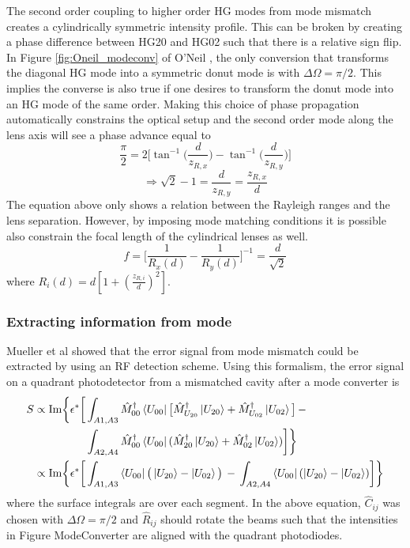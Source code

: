 The second order coupling to higher order HG modes from mode mismatch creates a cylindrically symmetric intensity profile.  This can be broken by creating a phase difference between HG20 and HG02 such that there is a relative sign flip.  In Figure \ref{fig:Oneil_modeconv} of O'Neil \cite{ONeilModeTransform}, the only conversion that transforms the diagonal HG mode into a symmetric donut mode is with $\Delta \Omega = \pi/2$. This implies the converse is also true if one desires to transform the donut mode into an HG mode of the same order. Making this choice of phase propagation automatically constrains the optical setup and the second order mode along the lens axis will see a phase advance equal to
	\begin{equation}
	\frac{\pi}{2} = 2\bigg[\tan^{-1}\bigg(\frac{d}{z_{R,x}}\bigg) - \tan^{-1} \bigg(\frac{d}{z_{R,y}} \bigg)  \bigg]
	\end{equation} 
	\begin{equation}
	  \Rightarrow \sqrt{2} - 1 = \frac{d}{z_{R,y}} = \frac{z_{R,x}}{d}
	\end{equation}
The equation above only shows a relation between the Rayleigh ranges and the lens separation. However, by imposing mode matching conditions it is possible also constrain the focal length of the cylindrical lenses as well.
	\begin{equation}
	f = \bigg[\frac{1}{R_x(d)} - \frac{1}{R_y(d)}\bigg]^{-1} = \frac{d}{\sqrt{2}}
	\end{equation}
	where $R_i(d) = d [ 1 + (\frac{z_{R,i}}{d})^2]$.

\subsubsection{Extracting information from mode}
Mueller et al \cite{MuellerMM} showed that the error signal from mode mismatch could be extracted by using an RF detection scheme. Using this formalism, the error signal on a quadrant photodetector from a mismatched cavity after a mode converter is 
	\begin{equation}
	\begin{aligned}
	S 	\propto  \text{Im} \bigg\{ \epsilon^{*} \bigg[&\int_{A1,A3} \hat{M}^{\dagger}_{00} \bra{U_{00}} \big[\hat{M}^{\dagger}_{U_{20}} \ket{U_{20}} + \hat{M}^{\dagger}_{U_{02}} \ket{U_{02}}\big]  \, -\\
	 \, &\int_{A2,A4} \hat{M}^{\dagger}_{00} \bra{U_{00}} (\hat{M}^{\dagger}_{20} \ket{U_{20}} + \hat{M}^{\dagger}_{02} \ket{U_{02}}) \bigg] \bigg\}\\
	\propto \text{Im} \bigg\{ \epsilon^{*} \bigg[&\int_{A1,A3} \bra{U_{00}} \big(\ket{U_{20}} - \ket{U_{02}}\big)  \,-\, \int_{A2,A4}  \bra{U_{00}} ( \ket{U_{20}} - \ket{U_{02}}) \bigg] \bigg\}
	\end{aligned}
	\end{equation}
where the surface integrals are over each segment.  In the above equation, $\hat{C}_{ij} $ was chosen with $\Delta \Omega = \pi/2$ and $\hat{R}_{ij}$ should rotate the beams such that the intensities in Figure {ModeConverter} are aligned with the quadrant photodiodes.

